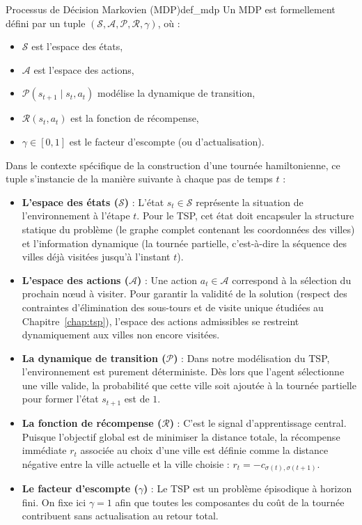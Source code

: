 \documentclass[12pt, a4paper, twoside, openright]{book}
\begin{document}
	\begin{definition}{Processus de Décision Markovien (MDP)}{def_mdp}
		Un MDP est formellement défini par un tuple $(\mathcal{S}, \mathcal{A}, \mathcal{P}, \mathcal{R}, \gamma)$, où :
		\begin{itemize}
			\item $\mathcal{S}$ est l'espace des états,
			\item $\mathcal{A}$ est l'espace des actions,
			\item $\mathcal{P}(s_{t+1} \mid s_t, a_t)$ modélise la dynamique de transition,
			\item $\mathcal{R}(s_t, a_t)$ est la fonction de récompense,
			\item $\gamma \in [0, 1]$ est le facteur d'escompte (ou d'actualisation).
		\end{itemize}
	\end{definition}
	
	Dans le contexte spécifique de la construction d'une tournée hamiltonienne, ce tuple s'instancie de la manière suivante à chaque pas de temps $t$ :
	
	\begin{itemize}
		\item \textbf{L'espace des états ($\mathcal{S}$)} : L'état $s_t \in \mathcal{S}$ représente la situation de l'environnement à l'étape $t$. Pour le TSP, cet état doit encapsuler la structure statique du problème (le graphe complet contenant les coordonnées des villes) et l'information dynamique (la tournée partielle, c'est-à-dire la séquence des villes déjà visitées jusqu'à l'instant $t$).
		
		\item \textbf{L'espace des actions ($\mathcal{A}$)} : Une action $a_t \in \mathcal{A}$ correspond à la sélection du prochain n\oe{}ud à visiter. Pour garantir la validité de la solution (respect des contraintes d'élimination des sous-tours et de visite unique étudiées au Chapitre~\ref{chap:tsp}), l'espace des actions admissibles se restreint dynamiquement aux villes non encore visitées.
		
		\item \textbf{La dynamique de transition ($\mathcal{P}$)} : Dans notre modélisation du TSP, l'environnement est purement déterministe. Dès lors que l'agent sélectionne une ville valide, la probabilité que cette ville soit ajoutée à la tournée partielle pour former l'état $s_{t+1}$ est de $1$.
		
		\item \textbf{La fonction de récompense ($\mathcal{R}$)} : C'est le signal d'apprentissage central. Puisque l'objectif global est de minimiser la distance totale, la récompense immédiate $r_t$ associée au choix d'une ville est définie comme la distance négative entre la ville actuelle et la ville choisie : $r_t = -c_{\sigma(t), \sigma(t+1)}$. 
		
		\item \textbf{Le facteur d'escompte ($\gamma$)} : Le TSP est un problème épisodique à horizon fini. On fixe ici $\gamma = 1$ afin que toutes les composantes du coût de la tournée contribuent sans actualisation au retour total.
	\end{itemize}
	
\end{document}
